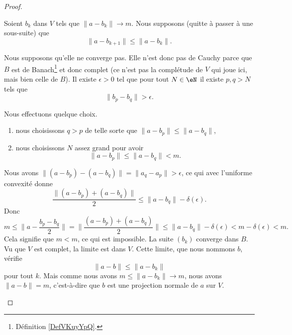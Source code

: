 \begin{proof}
\begin{subproof}
        \spitem[Existence]
        Soient \( b_k\) dans \( V\) tels que \( \| a-b_k \|\to m\). Nous supposons (quitte à passer à une sous-suite) que
        \begin{equation}
            \| a-b_{k+1} \|\leq \| a-b_k \|.
        \end{equation}
        \begin{subproof}
            Nous supposons qu'elle ne converge pas. Elle n'est donc pas de Cauchy parce que \( B\) est de Banach\footnote{Définition \ref{DefVKuyYpQ}.} et donc complet (ce n'est pas la complétude de \( V\) qui joue ici, mais bien celle de \( B\)). Il existe \( \epsilon>0\) tel que pour tout \( N\in \eN\) il existe \( p,q>N\) tels que
            \begin{equation}
                \| b_p-b_q \|>\epsilon.
            \end{equation}

            Nous effectuons quelque choix.
            \begin{enumerate}
                \item
                      nous choisissons \( q>p\) de telle sorte que \( \| a-b_p \|\leq\| a-b_q \|\),
                \item
                      nous choisissons \( N\) assez grand pour avoir
                      \begin{equation}
                          \| a-b_p \|\leq \| a-b_q \|<m.
                      \end{equation}
            \end{enumerate}


            Nous avons \( \| (a-b_p)-(a-b_q) \|=\| a_q-a_p \|>\epsilon\), ce qui avec l'uniforme convexité donne
            \begin{equation}
                \frac{ \| (a-b_p)+(a-b_q) \| }{2}\leq \| a-b_q \|-\delta(\epsilon).
            \end{equation}
            Donc
            \begin{equation}
                m\leq \| a-\frac{ b_p-b_q }{ 2 } \|=\| \frac{ (a-b_p)+(a-b_q) }{2} \|\leq \| a-b_q \|-\delta(\epsilon)<m-\delta(\epsilon)<m.
            \end{equation}
            Cela signifie que \( m<m\), ce qui est impossible.
            \spitem[Conclusion]
            La suite \( (b_k)\) converge dans \( B\). Vu que \( V\) est complet, la limite est dans \( V\). Cette limite, que nous nommons \( b\), vérifie
            \begin{equation}
                \| a-b \|\leq \| a-b_k \|
            \end{equation}
            pour tout \( k\). Mais comme nous avons \( m\leq \| a-b_k \|\to m\), nous avons \( \| a-b \|=m\), c'est-à-dire que \( b\) est une projection normale de \( a\) sur \( V\).
        \end{subproof}
    \end{subproof}
\end{proof}

